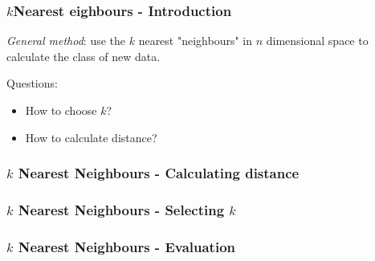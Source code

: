 \documentclass[xcolor={dvipsnames}]{beamer}
\begin{document}
\begin{frame}
	\frametitle{\(k\)Nearest eighbours - Introduction}


	\textit{General method}: use the \(k\) nearest "neighbours" in \(n\)
	dimensional space to calculate the class of new data.

	\vspace{0.5cm}

	Questions:
	\begin{itemize}
		\item{How to choose \(k\)?}
		\item{How to calculate distance?}
	\end{itemize}
\end{frame}

\begin{frame}
	\frametitle{\(k\) Nearest Neighbours - Calculating distance}
	
\end{frame}

\begin{frame}
	\frametitle{\(k\) Nearest Neighbours - Selecting \(k\)}

\end{frame}

\begin{frame}
	\frametitle{\(k\) Nearest Neighbours - Evaluation}

\end{frame}
\end{document}
